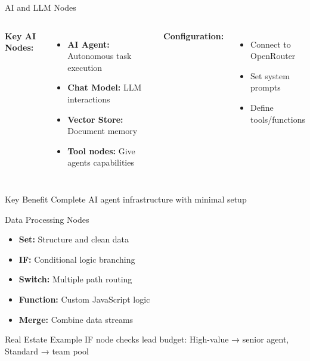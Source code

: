 \documentclass{beamer}
\begin{document}
\begin{frame}{AI and LLM Nodes}
  \begin{columns}[onlytextwidth]
      \textbf{Key AI Nodes:}
      \begin{itemize}
        \item \textbf{AI Agent:} Autonomous task execution
        \item \textbf{Chat Model:} LLM interactions
        \item \textbf{Vector Store:} Document memory
        \item \textbf{Tool nodes:} Give agents capabilities
      \end{itemize}
      
      \vspace{0.3cm}
      \textbf{Configuration:}
      \begin{itemize}
        \item Connect to OpenRouter
        \item Set system prompts
        \item Define tools/functions
      \end{itemize}
  \end{columns}
  
  \begin{block}{Key Benefit}
    Complete AI agent infrastructure with minimal setup
  \end{block}
\end{frame}

\begin{frame}{Data Processing Nodes}
  \small
  \begin{itemize}
    \item \textbf{Set:} Structure and clean data
    \item \textbf{IF:} Conditional logic branching
    \item \textbf{Switch:} Multiple path routing
    \item \textbf{Function:} Custom JavaScript logic
    \item \textbf{Merge:} Combine data streams
  \end{itemize}
  
  \begin{block}{Real Estate Example}
    IF node checks lead budget: High-value → senior agent, Standard → team pool
  \end{block}
\end{frame}
\end{document}

